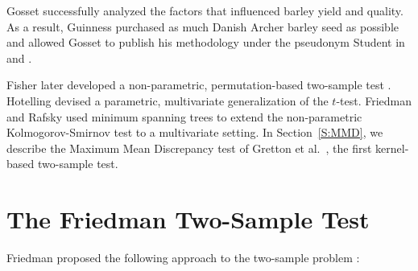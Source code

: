 Gosset successfully analyzed the factors that influenced barley yield
and quality.  As a result, Guinness purchased as much Danish Archer
barley seed as possible and allowed Gosset to publish his methodology
under the pseudonym Student in \cite{student1908probable} and
\cite{student1908probable2}.

Fisher later developed a non-parametric, permutation-based two-sample
test \cite{fisher1935design}.  Hotelling
\cite{hotelling1931generalization} devised a parametric, multivariate
generalization of the $t$-test.  Friedman and Rafsky
\cite{friedman1979multivariate} used minimum spanning trees to extend
the non-parametric Kolmogorov-Smirnov test \cite{smirnoff1939estimation}
to a multivariate setting.  In Section~\ref{S:MMD}, we describe the
Maximum Mean Discrepancy test of Gretton et al.\ \cite{gretton19m},
the first kernel-based two-sample test.



\section{The Friedman Two-Sample Test}
Friedman proposed the following approach to the two-sample problem
\cite{friedman30908multivariate}:

